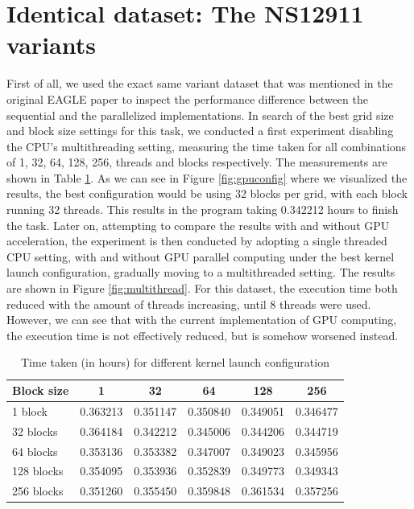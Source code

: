 \documentclass{PHlab-thesis}
\begin{document}
\section{Identical dataset: The NS12911 variants}
First of all, we used the exact same variant dataset that was mentioned in the original EAGLE paper to inspect the performance difference between the sequential and the parallelized implementations. In search of the best grid size and block size settings for this task, we conducted a first experiment disabling the CPU's multithreading setting, measuring the time taken for all combinations of 1, 32, 64, 128, 256, threads and blocks respectively. The measurements are shown in Table \ref{table:1}. As we can see in Figure \ref{fig:gpuconfig} where we visualized the results, the best configuration would be using 32 blocks per grid, with each block running 32 threads. This results in the program taking 0.342212 hours to finish the task. Later on, attempting to compare the results with and without GPU acceleration, the experiment is then conducted by adopting a single threaded CPU setting, with and without GPU parallel computing under the best kernel launch configuration, gradually moving to a multithreaded setting. The results are shown in Figure \ref{fig:multithread}. For this dataset, the execution time both reduced with the amount of threads increasing, until 8 threads were used. However, we can see that with the current implementation of GPU computing, the execution time is not effectively reduced, but is somehow worsened instead.
\begin{table}[h!]
	\centering
	\begin{tabular}{l*{5}{c}}
		Block size              & 1 & 32 & 64 & 128 & 256\\
		\hline
		1 block & 0.363213 & 0.351147 & 0.350840 & 0.349051 & 0.346477  \\
		32 blocks            & 0.364184 & 0.342212 & 0.345006 & 0.344206 & 0.344719  \\
		64 blocks          & 0.353136 & 0.353382 & 0.347007 & 0.349023 & 0.345956  \\
		128 blocks     & 0.354095 & 0.353936 & 0.352839 & 0.349773 & 0.349343  \\
		256 blocks     & 0.351260 & 0.355450 & 0.359848 & 0.361534 & 0.357256  \\
	\end{tabular}
	\caption{Time taken (in hours) for different kernel launch configuration}
	\label{table:1}
\end{table}
\end{document}
